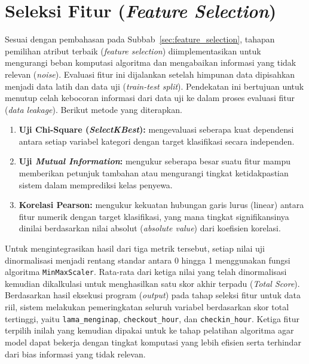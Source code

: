 \section{Seleksi Fitur (\textit{Feature Selection})}

Sesuai dengan pembahasan pada Subbab~\ref{sec:feature_selection}, tahapan pemilihan atribut terbaik (\textit{feature selection}) diimplementasikan untuk mengurangi beban komputasi algoritma dan mengabaikan informasi yang tidak relevan (\textit{noise}). Evaluasi fitur ini dijalankan setelah himpunan data dipisahkan menjadi data latih dan data uji (\textit{train-test split}). Pendekatan ini bertujuan untuk menutup celah kebocoran informasi dari data uji ke dalam proses evaluasi fitur (\textit{data leakage}). Berikut metode yang diterapkan.
\begin{enumerate}
    \item \textbf{Uji Chi-Square (\textit{SelectKBest}):} mengevaluasi seberapa kuat dependensi antara setiap variabel kategori dengan target klasifikasi secara independen.
    \item \textbf{Uji \textit{Mutual Information}:} mengukur seberapa besar suatu fitur mampu memberikan petunjuk tambahan atau mengurangi tingkat ketidakpastian sistem dalam memprediksi kelas penyewa.
    \item \textbf{Korelasi Pearson:} mengukur kekuatan hubungan garis lurus (linear) antara fitur numerik dengan target klasifikasi, yang mana tingkat signifikansinya dinilai berdasarkan nilai absolut (\textit{absolute value}) dari koefisien korelasi.
\end{enumerate}

Untuk mengintegrasikan hasil dari tiga metrik tersebut, setiap nilai uji dinormalisasi menjadi rentang standar antara 0 hingga 1 menggunakan fungsi algoritma \texttt{MinMaxScaler}. Rata-rata dari ketiga nilai yang telah dinormalisasi kemudian dikalkulasi untuk menghasilkan satu skor akhir terpadu (\textit{Total Score}). Berdasarkan hasil eksekusi program (\textit{output}) pada tahap seleksi fitur untuk data riil, sistem melakukan pemeringkatan seluruh variabel berdasarkan skor total tertinggi, yaitu \texttt{lama\_menginap}, \texttt{checkout\_hour}, dan \texttt{checkin\_hour}. Ketiga fitur terpilih inilah yang kemudian dipakai untuk ke tahap pelatihan algoritma agar model dapat bekerja dengan tingkat komputasi yang lebih efisien serta terhindar dari bias informasi yang tidak relevan.